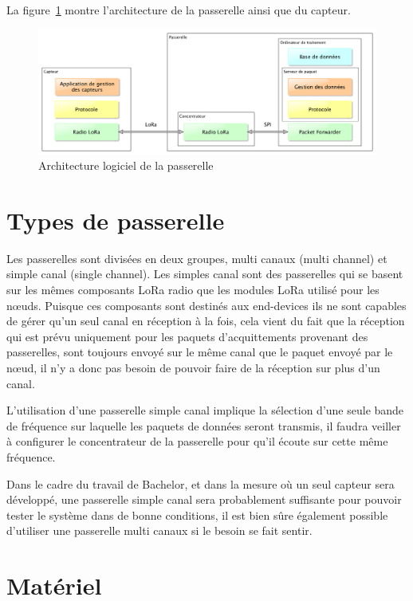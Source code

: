 La figure~\ref{fig:archi_passerelle} montre l'architecture de la passerelle ainsi que du capteur.

\begin{figure}[htb]
\centering 
\includegraphics[width=1\columnwidth]{../images/capteur_lora.png} 
\caption[Architecture logiciel de la passerelle]{Architecture logiciel de la passerelle}
\label{fig:archi_passerelle}
\end{figure}

\section{Types de passerelle}

Les passerelles sont divisées en deux groupes, multi canaux (multi channel) et simple canal (single channel). Les simples canal sont des passerelles qui se basent sur les mêmes composants LoRa radio que les modules LoRa utilisé pour les nœuds. Puisque ces composants sont destinés aux end-devices ils ne sont capables de gérer qu’un seul canal en réception à la fois, cela vient du fait que la réception qui est prévu uniquement pour les paquets d’acquittements provenant des passerelles, sont toujours envoyé sur le même canal que le paquet envoyé par le nœud, il n’y a donc pas besoin de pouvoir faire de la réception sur plus d’un canal.

L’utilisation d’une passerelle simple canal implique la sélection d’une seule bande de fréquence sur laquelle les paquets de données seront transmis, il faudra veiller à configurer le concentrateur de la passerelle pour qu’il écoute sur cette même fréquence.

Dans le cadre du travail de Bachelor, et dans la mesure où un seul capteur sera développé, une passerelle simple canal sera probablement suffisante pour pouvoir tester le système dans de bonne conditions, il est bien sûre également possible d’utiliser une passerelle multi canaux si le besoin se fait sentir.

\section{Matériel}

